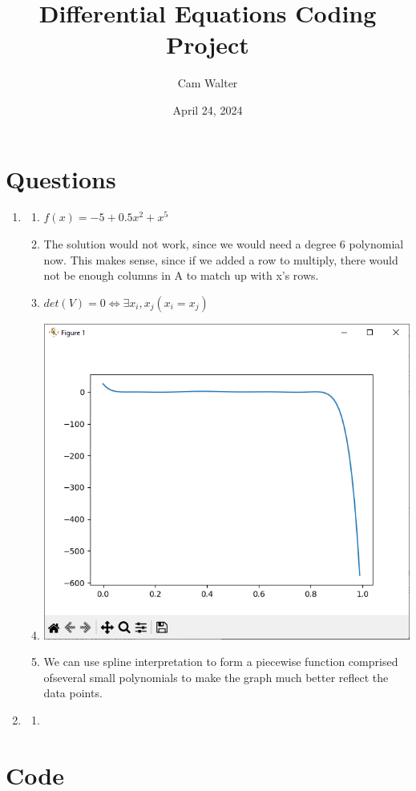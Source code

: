 \documentclass{article}
\title{Differential Equations Coding Project}
\author{Cam Walter}
\date{April 24, 2024}
\begin{document}
\maketitle

\section*{Questions}

\begin{enumerate}
  \item
        \begin{enumerate}
          \item \begin{math}
                  f(x) = -5 + 0.5x^2 + x^5
                \end{math}
          \item The solution would not work, since we would need a degree 6
                polynomial now. This makes sense, since if we added a row to multiply,
                there would not be enough columns in A to match up with x's rows.
          \item \begin{math}
                  det(V)=0 \iff \exists x_i, x_j (x_i=x_j)
                \end{math}
          \item \includegraphics[width=\linewidth]{image.png}
          \item We can use spline interpretation to form a piecewise function
                comprised ofseveral small polynomials to make the graph much better
                reflect the data points.
        \end{enumerate}

  \item \begin{enumerate}
          \item
        \end{enumerate}
\end{enumerate}

\pagebreak

\section*{Code}
\inputminted{python3}{main.py}
\end{document}
